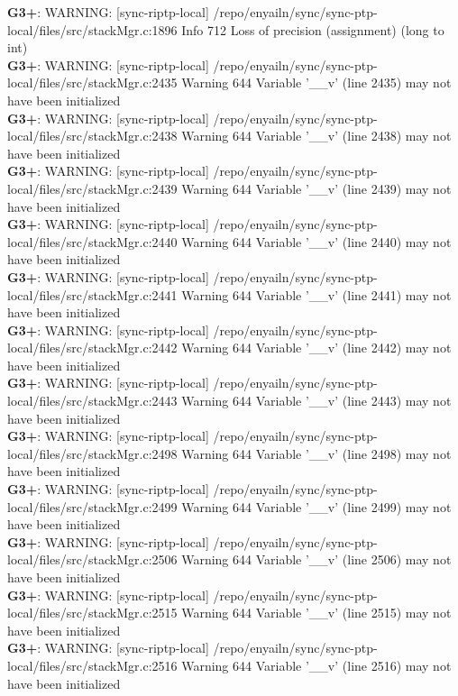 \documentclass[12pt,twoside]{article}
\begin{document}
\textbf{G3+}: WARNING: [sync-riptp-local] /repo/enyailn/sync/sync-ptp-local/files/src/stackMgr.c:1896 Info 712 Loss of precision (assignment) (long to int)\\ 
\textbf{G3+}: WARNING: [sync-riptp-local] /repo/enyailn/sync/sync-ptp-local/files/src/stackMgr.c:2435 Warning 644 Variable '\_\_v' (line 2435) may not have been initialized\\ 
\textbf{G3+}: WARNING: [sync-riptp-local] /repo/enyailn/sync/sync-ptp-local/files/src/stackMgr.c:2438 Warning 644 Variable '\_\_v' (line 2438) may not have been initialized\\ 
\textbf{G3+}: WARNING: [sync-riptp-local] /repo/enyailn/sync/sync-ptp-local/files/src/stackMgr.c:2439 Warning 644 Variable '\_\_v' (line 2439) may not have been initialized\\ 
\textbf{G3+}: WARNING: [sync-riptp-local] /repo/enyailn/sync/sync-ptp-local/files/src/stackMgr.c:2440 Warning 644 Variable '\_\_v' (line 2440) may not have been initialized\\ 
\textbf{G3+}: WARNING: [sync-riptp-local] /repo/enyailn/sync/sync-ptp-local/files/src/stackMgr.c:2441 Warning 644 Variable '\_\_v' (line 2441) may not have been initialized\\ 
\textbf{G3+}: WARNING: [sync-riptp-local] /repo/enyailn/sync/sync-ptp-local/files/src/stackMgr.c:2442 Warning 644 Variable '\_\_v' (line 2442) may not have been initialized\\ 
\textbf{G3+}: WARNING: [sync-riptp-local] /repo/enyailn/sync/sync-ptp-local/files/src/stackMgr.c:2443 Warning 644 Variable '\_\_v' (line 2443) may not have been initialized\\ 
\textbf{G3+}: WARNING: [sync-riptp-local] /repo/enyailn/sync/sync-ptp-local/files/src/stackMgr.c:2498 Warning 644 Variable '\_\_v' (line 2498) may not have been initialized\\ 
\textbf{G3+}: WARNING: [sync-riptp-local] /repo/enyailn/sync/sync-ptp-local/files/src/stackMgr.c:2499 Warning 644 Variable '\_\_v' (line 2499) may not have been initialized\\ 
\textbf{G3+}: WARNING: [sync-riptp-local] /repo/enyailn/sync/sync-ptp-local/files/src/stackMgr.c:2506 Warning 644 Variable '\_\_v' (line 2506) may not have been initialized\\ 
\textbf{G3+}: WARNING: [sync-riptp-local] /repo/enyailn/sync/sync-ptp-local/files/src/stackMgr.c:2515 Warning 644 Variable '\_\_v' (line 2515) may not have been initialized\\ 
\textbf{G3+}: WARNING: [sync-riptp-local] /repo/enyailn/sync/sync-ptp-local/files/src/stackMgr.c:2516 Warning 644 Variable '\_\_v' (line 2516) may not have been initialized\\ 
\end{document}
